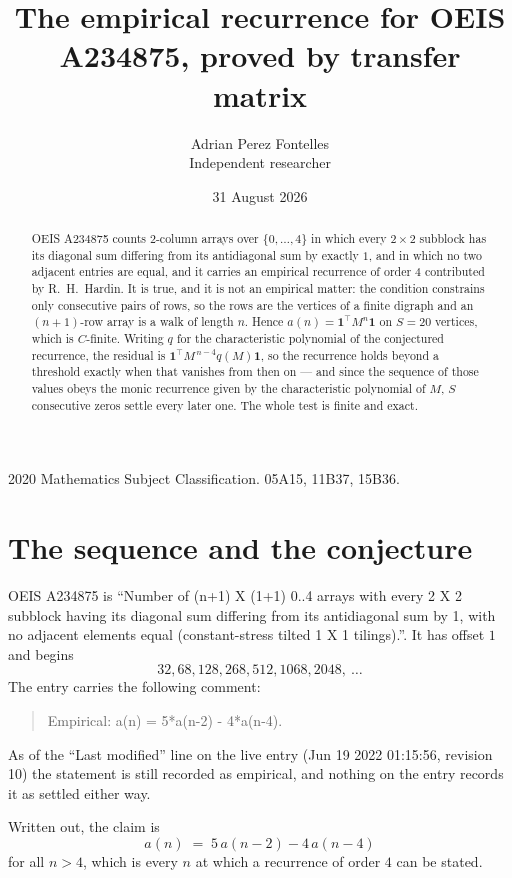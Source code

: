 \documentclass[11pt,a4paper]{article}
\title{The empirical recurrence for OEIS A234875, proved by transfer matrix}
\author{Adrian Perez Fontelles\\ \small Independent researcher}
\date{31 August 2026}
\theoremstyle{plain}
\theoremstyle{definition}
\begin{document}
\maketitle

\begin{abstract}
OEIS A234875 counts $2$-column arrays over $\{0,\dots,4\}$ in which every
$2\times2$ subblock has its diagonal sum differing from its antidiagonal sum by
exactly $1$, and in which no two adjacent entries are equal, and it
carries an empirical recurrence of order $4$ contributed by R.~H.~Hardin. It is true,
and it is not an empirical matter: the condition constrains only consecutive pairs of rows,
so the rows are the vertices of a finite digraph and an $(n+1)$-row array is a walk of
length $n$. Hence $a(n)=\mathbf{1}^{\!\top}M^{n}\mathbf{1}$ on $S=20$ vertices, which
is $C$-finite. Writing $q$ for the characteristic polynomial of the conjectured recurrence,
the residual is $\mathbf{1}^{\!\top}M^{\,n-4}q(M)\mathbf{1}$, so the recurrence
holds beyond a threshold exactly when that vanishes from then on --- and since the sequence
of those values obeys the monic recurrence given by the characteristic polynomial of $M$,
$S$ consecutive zeros settle every later one. The whole test is finite and exact.
\end{abstract}

\noindent\small 2020 Mathematics Subject Classification. 05A15, 11B37, 15B36.\normalsize

\section{The sequence and the conjecture}

OEIS A234875 is ``Number of (n+1) X (1+1) 0..4 arrays with every 2 X 2 subblock having its diagonal sum differing from its antidiagonal sum by 1, with no adjacent elements equal (constant-stress tilted 1 X 1 tilings).''. It has offset
$1$ and begins
\[
32, 68, 128, 268, 512, 1068, 2048,\ \dots
\]
The entry carries the following comment:
\begin{quote}\small
Empirical: a(n) = 5*a(n-2) - 4*a(n-4).
\end{quote}
As of the ``Last modified'' line on the live entry (Jun 19 2022 01:15:56, revision 10) the statement is
still recorded as empirical, and nothing on the entry records it as settled either way.

Written out, the claim is
\begin{equation}\label{eq:conj}
a(n)\;=\;5\,a(n-2) - 4\,a(n-4)
\end{equation}
for all $n>4$, which is every $n$ at which a recurrence of order $4$ can be
stated.
\end{document}
